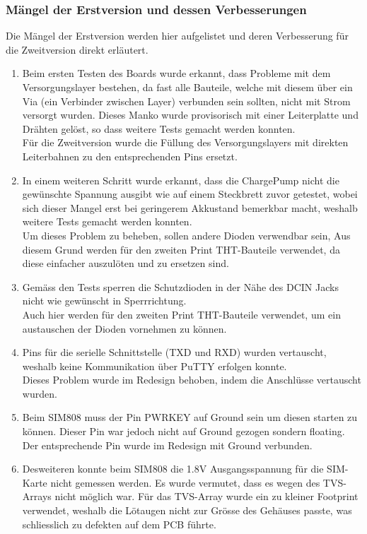 \subsubsection{Mängel der Erstversion und dessen Verbesserungen}
Die Mängel der Erstversion werden hier aufgelistet und deren Verbesserung für die Zweitversion direkt erläutert.
\begin{enumerate}
\item Beim ersten Testen des Boards wurde erkannt, dass Probleme mit dem Versorgungslayer bestehen, da fast alle Bauteile, welche mit diesem über ein Via (ein Verbinder zwischen Layer) verbunden sein sollten, nicht mit Strom versorgt wurden. Dieses Manko wurde provisorisch mit einer Leiterplatte und Drähten gelöst, so dass weitere Tests gemacht werden konnten.\\
Für die Zweitversion wurde die Füllung des Versorgungslayers mit direkten Leiterbahnen zu den entsprechenden Pins ersetzt.
\item In einem weiteren Schritt wurde erkannt, dass die ChargePump nicht die gewünschte Spannung ausgibt wie auf einem Steckbrett zuvor getestet, wobei sich dieser Mangel erst bei geringerem Akkustand bemerkbar macht, weshalb weitere Tests gemacht werden konnten.\\
Um dieses Problem zu beheben, sollen andere Dioden verwendbar sein, Aus diesem Grund werden für den zweiten Print THT-Bauteile verwendet, da diese einfacher auszulöten und zu ersetzen sind.
\item Gemäss den Tests sperren die Schutzdioden in der Nähe des DCIN Jacks nicht wie gewünscht in Sperrrichtung.\\
Auch hier werden für den zweiten Print THT-Bauteile verwendet, um ein austauschen der Dioden vornehmen zu können.
\item Pins für die serielle Schnittstelle (TXD und RXD) wurden vertauscht, weshalb keine Kommunikation über PuTTY erfolgen konnte.\\
Dieses Problem wurde im Redesign behoben, indem die Anschlüsse vertauscht wurden.
\item Beim SIM808 muss der Pin PWRKEY auf Ground sein um diesen starten zu können. Dieser Pin war jedoch nicht auf Ground gezogen sondern floating.\\
Der entsprechende Pin wurde im Redesign mit Ground verbunden.
\item Desweiteren konnte beim SIM808 die 1.8V Ausgangsspannung für die SIM-Karte nicht gemessen werden. Es wurde vermutet, dass es wegen des TVS-Arrays nicht möglich war. Für das TVS-Array wurde ein zu kleiner Footprint verwendet, weshalb die Lötaugen nicht zur Grösse des Gehäuses passte, was schliesslich zu defekten auf dem PCB führte.\\

\end{enumerate}
